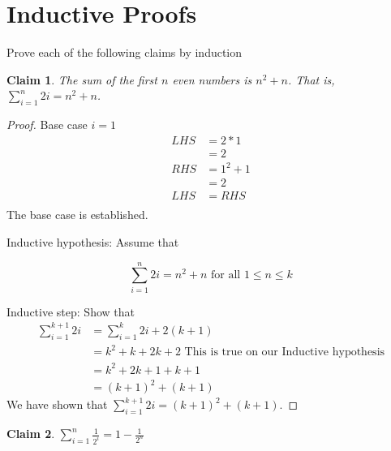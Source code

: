 \documentclass{article}
\newtheorem{claim}{Claim}
\begin{document}
    \section{Inductive Proofs}

    Prove each of the following claims by induction

    \begin{claim}
      The sum of the first $n$ even numbers is $n^2 + n$.  That is, $\sum\limits_{i=1}^{n} 2i = n^2 + n$.
    \end{claim}
    \begin{proof}

      Base case $i = 1$
      \begin{align*} 
        LHS &=  2 * 1 \\ 
         &=  2\\
        RHS &= 1^2+1\\
        &=2\\
        LHS &= RHS\\
        \end{align*}
    The base case is established.

    Inductive hypothesis: Assume that
      
      \[ \sum\limits_{i=1}^{n} 2i = n^2 + n \mbox{ for all $1 \leq n \leq k$}\]
     
    Inductive step: Show that
      \begin{align*} 
        \sum\limits_{i=1}^{k+1} 2i &= \sum\limits_{i=1}^{k} 2i + 2(k+1)\\ 
         &=  k^2+k+2k+2 \mbox{ This is true on our Inductive hypothesis}\\
         &= k^2+2k+1+k+1\\
         &= (k+1)^2 + (k+1)
        \end{align*}
    We have shown that $\sum\limits_{i=1}^{k+1} 2i = (k+1)^2 + (k+1)$.
  
  \end{proof}
    \begin{claim}
      $\sum\limits_{i=1}^{n} \frac{1}{2^i} = 1 - \frac{1}{2^n}$
    \end{claim}
\end{document}
